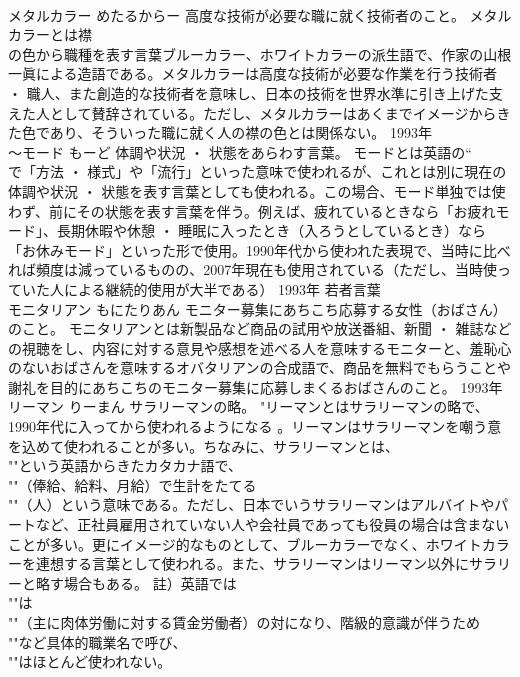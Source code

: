 \documentclass[8pt]{extreport}
\begin{document}
\begin{CJK}{UTF8}{min}
\\	メタルカラー	めたるからー	高度な技術が必要な職に就く技術者のこと。	メタルカラーとは襟
\\	の色から職種を表す言葉ブルーカラー、ホワイトカラーの派生語で、作家の山根一眞による造語である。メタルカラーは高度な技術が必要な作業を行う技術者 ・ 職人、また創造的な技術者を意味し、日本の技術を世界水準に引き上げた支えた人として賛辞されている。ただし、メタルカラーはあくまでイメージからきた色であり、そういった職に就く人の襟の色とは関係ない。	1993年	
\\	～モード	もーど	体調や状況 ・ 状態をあらわす言葉。	モードとは英語の“
\\	で「方法 ・ 様式」や「流行」といった意味で使われるが、これとは別に現在の体調や状況 ・ 状態を表す言葉としても使われる。この場合、モード単独では使わず、前にその状態を表す言葉を伴う。例えば、疲れているときなら「お疲れモード」、長期休暇や休憩 ・ 睡眠に入ったとき（入ろうとしているとき）なら「お休みモード」といった形で使用。1990年代から使われた表現で、当時に比べれば頻度は減っているものの、2007年現在も使用されている（ただし、当時使っていた人による継続的使用が大半である）	1993年	若者言葉	
\\	モニタリアン	もにたりあん	モニター募集にあちこち応募する女性（おばさん）のこと。	モニタリアンとは新製品など商品の試用や放送番組、新聞 ・ 雑誌などの視聴をし、内容に対する意見や感想を述べる人を意味するモニターと、羞恥心のないおばさんを意味するオバタリアンの合成語で、商品を無料でもらうことや謝礼を目的にあちこちのモニター募集に応募しまくるおばさんのこと。	1993年	
\\	リーマン	りーまん	サラリーマンの略。	"リーマンとはサラリーマンの略で、1990年代に入ってから使われるようになる 。リーマンはサラリーマンを嘲う意を込めて使われることが多い。ちなみに、サラリーマンとは、
\\	""という英語からきたカタカナ語で、
\\	""（俸給、給料、月給）で生計をたてる
\\	""（人）という意味である。ただし、日本でいうサラリーマンはアルバイトやパートなど、正社員雇用されていない人や会社員であっても役員の場合は含まないことが多い。更にイメージ的なものとして、ブルーカラーでなく、ホワイトカラーを連想する言葉として使われる。また、サラリーマンはリーマン以外にサラリーと略す場合もある。 註）英語では
\\	""は
\\	""（主に肉体労働に対する賃金労働者）の対になり、階級的意識が伴うため
\\	""など具体的職業名で呼び、
\\	""はほとんど使われない。

\end{CJK}
\end{document}
